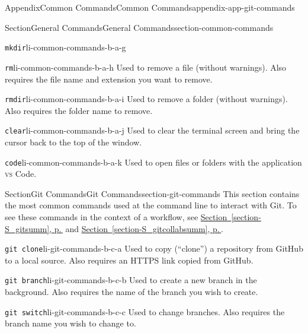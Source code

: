 \documentclass[twoside,10pt,]{book}
\newcommand{\xreffont}{\relax}
\newcommand{\mono}[1]{\texttt{#1}}
\newcommand{\initialism}[1]{\textsc{\MakeLowercase{#1}}}
\begin{document}
\begin{appendixptx}{Appendix}{Common Commands}{}{Common Commands}{}{}{appendix-app-git-commands}
\begin{sectionptx}{Section}{General Commands}{}{General Commands}{}{}{section-common-commands}
\begin{descriptionlist}
\begin{dlimedium}{\mono{mkdir}}{li-common-commands-b-a-g}
\end{dlimedium}%
\begin{dlimedium}{\mono{rm}}{li-common-commands-b-a-h}%
Used to remove a file (without warnings). Also requires the file name and extension you want to remove.%
\end{dlimedium}%
\begin{dlimedium}{\mono{rmdir}}{li-common-commands-b-a-i}%
Used to remove a folder (without warnings). Also requires the folder name to remove.%
\end{dlimedium}%
\begin{dlimedium}{\mono{clear}}{li-common-commands-b-a-j}%
Used to clear the terminal screen and bring the cursor back to the top of the window.%
\end{dlimedium}%
\begin{dlimedium}{\mono{code}}{li-common-commands-b-a-k}%
Used to open files or folders with the application \initialism{VS} Code.%
\end{dlimedium}%
\end{descriptionlist}
%
\end{sectionptx}
%
%
\typeout{************************************************}
\typeout{************************************************}
%
\begin{sectionptx}{Section}{Git Commands}{}{Git Commands}{}{}{section-git-commands}
This section contains the most common commands used at the command line to interact with Git. To see these commands in the context of a workflow, see \hyperref[section-S_gitsumm]{Section~{\xreffont\ref{section-S_gitsumm}}, p.\,\pageref{section-S_gitsumm}} and \hyperref[section-S_gitcollabsumm]{Section~{\xreffont\ref{section-S_gitcollabsumm}}, p.\,\pageref{section-S_gitcollabsumm}}.%
\begin{descriptionlist}
\begin{dlimedium}{\mono{git clone}}{li-git-commands-b-c-a}%
Used to copy (``clone'') a repository from GitHub to a local source. Also requires an HTTPS link copied from GitHub.%
\end{dlimedium}%
\begin{dlimedium}{\mono{git branch}}{li-git-commands-b-c-b}%
Used to create a new branch in the background. Also requires the name of the branch you wish to create.%
\end{dlimedium}%
\begin{dlimedium}{\mono{git switch}}{li-git-commands-b-c-c}%
Used to change branches. Also requires the branch name you wish to change to.%

\end{dlimedium}
\end{descriptionlist}
\end{sectionptx}
\end{appendixptx}
\end{document}
